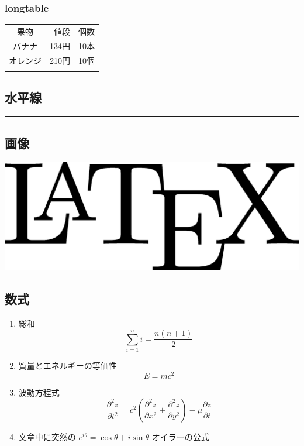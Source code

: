 \subsubsection{longtable}
\begin{longtable}[c]{@{}crr@{}}
\toprule\addlinespace
果物 & 値段 & 個数
\\\addlinespace
\midrule\endhead
バナナ & 134円 & 10本
\\\addlinespace
オレンジ & 210円 & 10個
\\\addlinespace
\bottomrule
\end{longtable}

\subsection{水平線}
\begin{center}\rule{3in}{0.4pt}\end{center}

\subsection{画像}
\includegraphics[width=\textwidth]{latex.eps}

\clearpage
\subsection{数式}
\begin{enumerate}

\item 総和
\begin{equation}
\sum_{i=1}^n i = \frac{n(n+1)}{2}
\end{equation}

\item 質量とエネルギーの等価性
\begin{equation}
E = mc ^2
\end{equation}

\item 波動方程式
\begin{equation}
\frac{\partial^2 z}{\partial t^2}=
c^2 (\frac{\partial^2 z}{\partial x^2}+\frac{\partial^2 z}{\partial y^2})-
\mu \frac{\partial z}{\partial t}
\end{equation}

\item 文章中に突然の $e^{i\theta}=\cos\theta+i\sin\theta$ オイラーの公式

\end{enumerate}
